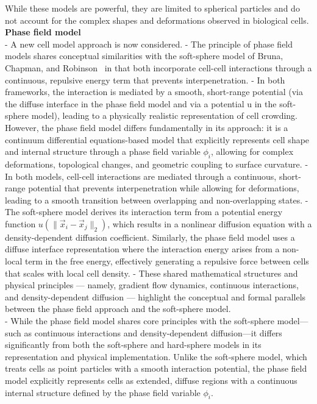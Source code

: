 While these models are powerful, they are limited to spherical particles and do not account for the complex shapes and deformations observed in biological cells.  \\


\textbf{Phase field model} \\

- A new cell model approach is now considered. 
- The principle of phase field models shares conceptual similarities with the soft-sphere model of Bruna, Chapman, and Robinson~\cite{BCR17} in that both incorporate cell-cell interactions through a continuous, repulsive energy term that prevents interpenetration. 
- In both frameworks, the interaction is mediated by a smooth, short-range potential (via the diffuse interface in the phase field model and via a potential 
u in the soft-sphere model), leading to a physically realistic representation of cell crowding. 
However, the phase field model differs fundamentally in its approach: it is a continuum differential equations-based model that explicitly represents cell shape and internal structure through a phase field variable $\phi_i$, allowing for complex deformations, topological changes, and geometric coupling to surface curvature. 
- In both models, cell-cell interactions are mediated through a continuous, short-range potential that prevents interpenetration while allowing for deformations, leading to a smooth transition between overlapping and non-overlapping states. 
- The soft-sphere model derives its interaction term from a potential energy function $u(\|\vec{x}_i - \vec{x}_j\|_2)$, which results in a nonlinear diffusion equation with a density-dependent diffusion coefficient. Similarly, the phase field model uses a diffuse interface representation where the interaction energy arises from a non-local term in the free energy, effectively generating a repulsive force between cells that scales with local cell density. 
- These shared mathematical structures and physical principles — namely, gradient flow dynamics, continuous interactions, and density-dependent diffusion — highlight the conceptual and formal parallels between the phase field approach and the soft-sphere model. \\
- While the phase field model shares core principles with the soft-sphere model—such as continuous interactions and density-dependent diffusion—it differs significantly from both the soft-sphere and hard-sphere models in its representation and physical implementation. 
Unlike the soft-sphere model, which treats cells as point particles with a smooth interaction potential, the phase field model explicitly represents cells as extended, diffuse regions with a continuous internal structure defined by the phase field variable $\phi_i$. \\

